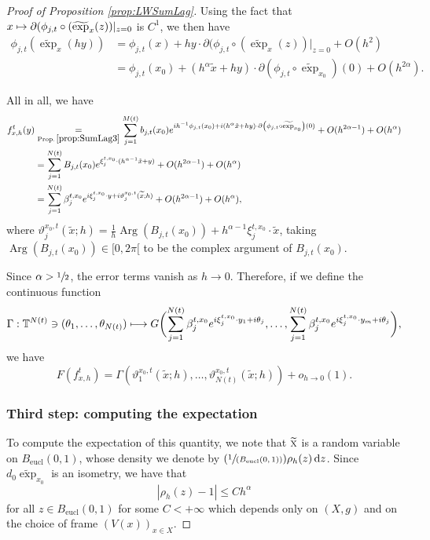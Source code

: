\documentclass[10pt]{amsart}
\newcommand{\NoChangel}[1]{%
\expandafter\let\csname old\string#1\endcsname=#1
\let#1=\relax
\newcommand{#1}{\mathcode`l="716C\csname old\string#1\endcsname\mathcode`l="7160 }%
}
\newcommand\mto{\mathchoice{\longmapsto}{\mapsto}{\mapsto}{\mapsto}}
\newcommand{\Psfrac}[2]{(\sfrac{#1}{#2})}
\newcommand{\rd}{\,\mathrm{d}}
\newcommand{\eucl}{\mathrm{eucl}}
\DeclareMathOperator{\Arg}{Arg}
\theoremstyle{plain}
\theoremstyle{definition}
\DeclareMathOperator{\Vol}{Vol}\NoChangel{\Vol}
\begin{document}
\begin{proof}[Proof of Proposition \ref{prop:LWSumLag}]
Using the fact that $x\mto \partial (\phi_{j,t}\circ(\widetilde{\exp}_{x}(z))|_{z=0}$ is $C^1$, we then have
\begin{align*}
\phi_{j,t}(\widetilde{\exp}_x(hy)) &= \phi_{j,t}(x) + hy \cdot \partial (\phi_{j,t}\circ(\widetilde{\exp}_x(z))|_{z=0}+ O(h^2)\\
&=\phi_{j,t}(x_0) + (h^\alpha \tilde{x}+ hy) \cdot \partial \left(\phi_{j,t}\circ \widetilde{\exp}_{x_0} \right)(0) + O(h^{2\alpha}).
\end{align*}

All in all, we have
\begin{align*}
f_{x, h}^t(y) &\underset{\textup{Prop.\,}\ref{prop:SumLag3}}{=}\sum_{j=1}^{M(t)} b_{j,t}(x_0) e^{i h^{-1}\phi_{j,t}(x_0) +i(h^\alpha \tilde{x}+ hy) \cdot \partial \left(\phi_{j,t}\circ \widetilde{\exp}_{x_0} \right)(0)} + O(h^{2\alpha - 1}) +O(h^\alpha)\\
&=\sum_{j=1}^{N(t)} B_{j,t}(x_0)e^{ \xi_j^{t,x_0} \cdot (h^{\alpha-1} \tilde{x}+ y)}+O(h^{2\alpha-1})+O(h^\alpha)\,\\
&=\sum_{j=1}^{N(t)}\beta_j^{t,x_0}e^{i\xi_j^{t,x_0}\cdot y+i\vartheta_j^{x_0,t}(\widetilde{x}; h)}+O(h^{2\alpha-1})+O(h^\alpha),
\end{align*}
where $\vartheta_j^{x_0,t}(\widetilde{x}; h)= \frac{1}{h} \Arg(B_{j,t}(x_0)) +h^{\alpha-1}\xi_j^{t,x_0}\cdot\widetilde{x}$, taking $\Arg(B_{j,t}(x_0))\in [0, 2\pi[$ to be the complex argument of $B_{j,t}(x_0)$.

Since $\alpha>\sfrac{1}{2}$, the error terms vanish as $h\to 0$. Therefore, if we define the continuous function
\[
\Gamma : \mathbb{T}^{N(t)} \ni (\theta_1,\dots,\theta_{N(t)}) \mto G \biggl(\sum_{j=1}^{N(t)}\beta_j^{t,x_0} e^{i\xi_j^{t,x_0}\cdot y_1+i\theta_j}, \dots, \sum_{j=1}^{N(t)}\beta_j^{t,x_0} e^{i\xi_j^{t,x_0}\cdot y_m+i\theta_j} \biggr),
\]
we have
\begin{equation}\label{eq:fixed_frame_local_limits_2}
F(f^t_{x,h})= \Gamma(\vartheta_1^{x_0,t}(\widetilde{x}; h),\dots,\vartheta_{N(t)}^{x_0,t}(\widetilde{x}; h)) +o_{h\to 0}(1).
\end{equation}

\subsubsection*{Third step: computing the expectation}
To compute the expectation of this quantity, we note that $\widetilde{\textsc{x}}$ is a random variable on $B_{\eucl}(0,1)$, whose density we denote by $\Psfrac{1}{\Vol(B_{\eucl}(0,1))}\rho_h(z)\rd z$. Since $d_0\widetilde{\exp}_{x_0}$ is an isometry, we have that
\begin{equation}\label{eq:fixed_frame_local_limits_1}
|\rho_h(z)-1|\leq C h^\alpha
\end{equation}
for all $z\in B_{\eucl}(0,1)$ for some $C<+\infty$ which depends only on $(X,g)$ and on the choice of frame $(V(x))_{x\in X}$.


\end{proof}
\end{document}
